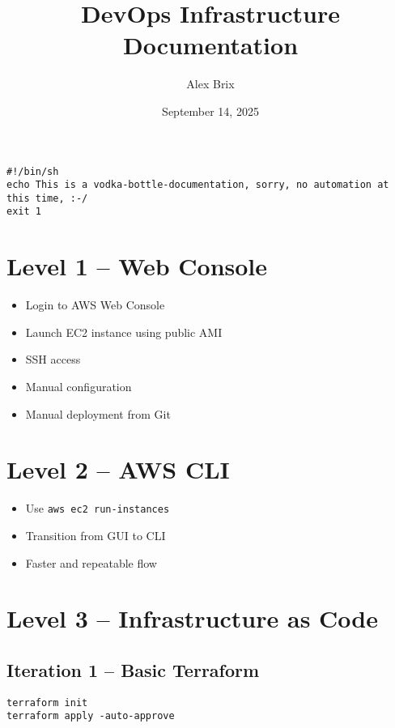 \documentclass{article}
\begin{document}
\begin{center}
\texttt{\#!/bin/sh} \\
\texttt{echo This is a vodka-bottle-documentation, sorry, no automation at this time, :-/} \\
\texttt{exit 1}
\end{center}

\vspace{1cm}

\title{DevOps Infrastructure Documentation}
\author{Alex Brix}
\date{September 14, 2025}

\maketitle

\section{Level 1 – Web Console}
\begin{itemize}
  \item Login to AWS Web Console
  \item Launch EC2 instance using public AMI
  \item SSH access
  \item Manual configuration
  \item Manual deployment from Git
\end{itemize}

\section{Level 2 – AWS CLI}
\begin{itemize}
  \item Use \texttt{aws ec2 run-instances}
  \item Transition from GUI to CLI
  \item Faster and repeatable flow
\end{itemize}

\section{Level 3 – Infrastructure as Code}

\subsection{Iteration 1 – Basic Terraform}
\begin{verbatim}
terraform init
terraform apply -auto-approve
\end{verbatim}
\end{document}

